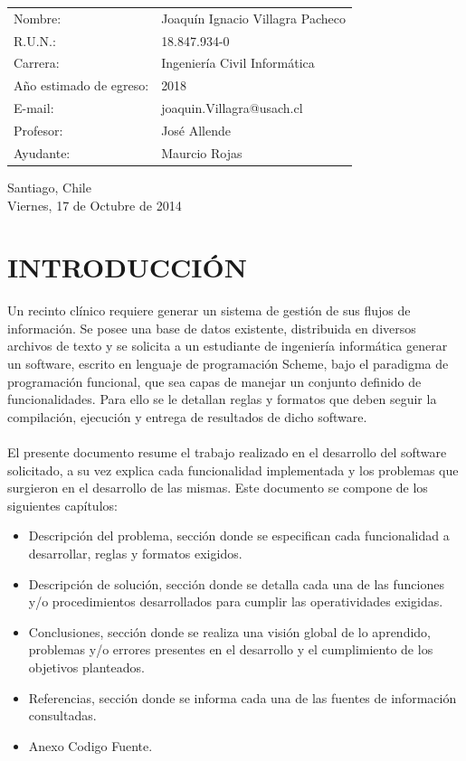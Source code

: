 \documentclass[12pt,letterpaper]{article}
\begin{document}
	\vspace{3cm}
	\begin{flushright}
		\begin{tabular}[t]{l l}
			Nombre: & Joaquín Ignacio Villagra Pacheco \\
			R.U.N.: & 18.847.934-0\\
			Carrera: & Ingeniería Civil Informática\\
			A\~no estimado de egreso: & 2018\\
			E-mail: & joaquin.Villagra@usach.cl\\
			Profesor: & José Allende\\
			Ayudante: & Maurcio Rojas

		\end{tabular}
	\end{flushright}
	\begin{center}
		\vspace{1.5cm}
		Santiago, Chile\\
		Viernes, 17 de Octubre de 2014
	\end{center}



\newpage
\tableofcontents
\thispagestyle{empty}

\newpage
\renewcommand{\thepage}{\arabic{page}}
\setcounter{page}{1}

\section{INTRODUCCIÓN}
Un recinto clínico requiere generar un sistema de gestión de sus flujos de información. Se posee una base de datos existente, distribuida en diversos archivos de texto y se solicita a un estudiante de ingeniería informática generar un software, escrito en lenguaje de programación Scheme, bajo el paradigma de programación funcional, que sea capas de manejar un conjunto definido de funcionalidades. Para ello se le detallan reglas y formatos que deben seguir la compilación, ejecución y entrega de resultados de dicho software.
\\
\\
El presente documento resume el trabajo realizado en el desarrollo del software solicitado, a su vez explica cada funcionalidad implementada y los problemas que surgieron en el desarrollo de las mismas.  Este documento se compone de los siguientes capítulos:
\begin{itemize}
\item Descripción del problema, sección donde se especifican cada funcionalidad a desarrollar, reglas y formatos exigidos.
\item Descripción de solución, sección donde se detalla cada una de las funciones y/o procedimientos desarrollados para cumplir las operatividades exigidas.
\item Conclusiones, sección donde se realiza una visión global de lo aprendido, problemas y/o errores presentes en el desarrollo y el cumplimiento de los objetivos planteados.
\item Referencias, sección donde se informa cada una de las fuentes de información consultadas.
\item Anexo Codigo Fuente.
\end{itemize}
\end{document}
